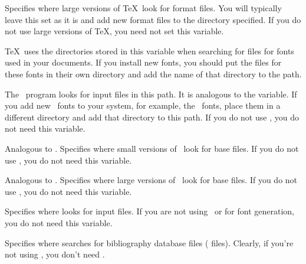 \begin{iplist}[\textnormal]{.25in}
  Specifies where large versions of \TeX\ look for format files.  You will
  typically leave this set as it is and add new format files to the
  directory specified.  If you do not use large versions of \TeX, you need
  not set this variable.  


  \TeX\ uses the directories stored in this variable when searching for
   files for fonts used in your documents.  If you install new
  fonts, you should put the  files for these fonts in their
  own directory and add the name of that directory to the 
  path.


  The \MF\ program looks for input files in this path.  It is analogous
  to the  variable.  If you add new \MF\ fonts to your
  system, for example, the \AmS\ fonts, place them in a different
  directory and add that directory to this path.  If you do not use \MF,
  you do not need this variable.


  Analogous to .  Specifies where small versions of
  \MF\ look for base files.  If you do not use \MF, you do not need
  this variable.


  Analogous to . Specifies where large versions of
  \MF\ look for base files.  If you do not use \MF, you do not need
  this variable.


  Specifies where  looks for input files.  If you are not
  using \MF\ or  for font generation, you do not need this
  variable.


  Specifies where  searches for bibliography database
  files ( files).  Clearly, if you're not using \BibTeX, you
  don't need .


\end{iplist}
